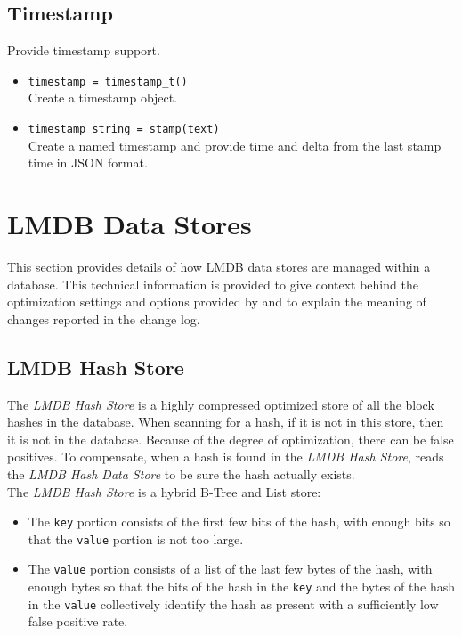 \documentclass[11pt,fleqn]{article} %
\begin{document}
\subsection{Timestamp}
Provide timestamp support.

\begin{itemize}
\item \verb+timestamp = timestamp_t()+\\
Create a timestamp object.
\item \verb+timestamp_string = stamp(text)+\\
Create a named timestamp and provide time and delta from the last stamp time in JSON format.
\end{itemize}

\section{LMDB Data Stores}
\label{LMDBDataStores}
This section provides details of how LMDB data stores are managed within a \hdb database. This technical information is provided to give context behind the optimization settings and options provided by \hdb and to explain the meaning of changes reported in the change log.\\

\subsection{LMDB Hash Store}
The \textit{LMDB Hash Store} is a highly compressed optimized store of all the block hashes in the database.  When scanning for a hash, if it is not in this store, then it is not in the database.  Because of the degree of optimization, there can be false positives.  To compensate, when a hash is found in the \textit{LMDB Hash Store}, \hdb reads the \textit{LMDB Hash Data Store} to be sure the hash actually exists.\\

The \textit{LMDB Hash Store} is a hybrid B-Tree and List store:
\begin{itemize}
\item The \verb+key+ portion consists of the first few bits of the hash, with enough bits so that the \verb+value+ portion is not too large.
\item The \verb+value+ portion consists of a list of the last few bytes of the hash, with enough bytes so that the bits of the hash in the \verb+key+ and the bytes of the hash in the \verb+value+ collectively identify the hash as present with a sufficiently low false positive rate.
\end{itemize}
\end{document}
